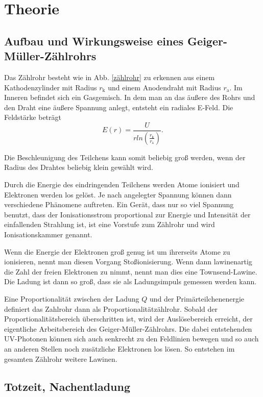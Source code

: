 \section{Theorie}
\label{sec:Theorie}

\subsection{Aufbau und Wirkungsweise eines Geiger-Müller-Zählrohrs}

Das Zählrohr besteht wie in Abb. \ref{zählrohr} zu erkennen aus einem Kathodenzylinder mit Radius $r_\text{k}$ und einem Anodendraht mit Radius $r_\text{a}$. Im Inneren befindet sich ein Gasgemisch. In dem man an das äußere des Rohrs und den Draht eine äußere Spannung anlegt, entsteht ein radiales E-Feld. Die Feldstärke beträgt 
\begin{equation}
    E(r) = \frac{U}{r ln(\frac{r_\text{k}}{r_\text{a}})}.
    \label{eqn:feldstärke}
\end{equation}

Die Beschleunigung des Teilchens kann somit beliebig groß werden, wenn der Radius des Drahtes beliebig klein gewählt wird. 

Durch die Energie des eindringenden Teilchens werden Atome ionisiert und Elektronen werden los gelöst. Je nach angelegter Spannung können dann verschiedene Phänomene auftreten. Ein Gerät, dass nur so viel Spannung benutzt, dass der Ionisationsstrom proportional zur Energie und Intensität der einfallenden Strahlung ist, ist eine Vorstufe zum Zählrohr und wird Ionisationskammer genannt. 

Wenn die Energie der Elektronen groß genug ist um ihrerseits Atome zu ionisieren, nennt man diesen Vorgang Stoßionisierung. Wenn dann lawinenartig die Zahl der freien Elektronen zu nimmt, nennt man dies eine Townsend-Lawine. 
Die Ladung ist dann so groß, dass sie als Ladungsimpuls gemessen werden kann.

Eine Proportionalität zwischen der Ladung $Q$ und der Primärteilchenenergie definiert das Zahlrohr dann als Proportionalitätzählrohr. 
Sobald der Proportionalitätsbereich überschritten ist, wird der Auslösebereich erreicht, der eigentliche Arbeitsbereich des Geiger-Müller-Zählrohrs. Die dabei entstehenden UV-Photonen können sich auch senkrecht zu den Feldlinien bewegen und so auch an anderen Stellen noch zusätzliche Elektronen los lösen. So entstehen im gesamten Zählrohr weitere Lawinen. 

\subsection{Totzeit, Nachentladung}

